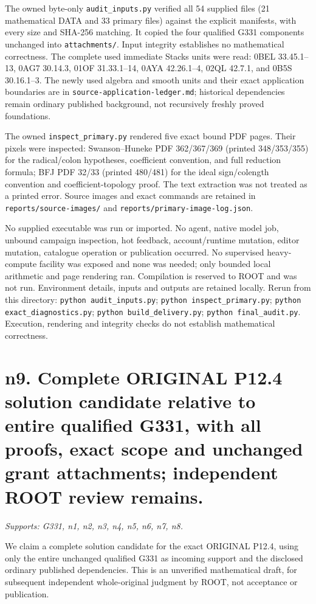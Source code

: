 \documentclass[11pt]{article}
\begin{document}
The owned byte-only \texttt{audit\_inputs.py} verified all 54 supplied files (21 mathematical DATA and 33 primary files) against the explicit manifests, with every size and SHA-256 matching. It copied the four qualified G331 components unchanged into \texttt{attachments/}. Input integrity establishes no mathematical correctness. The complete used immediate Stacks units were read: 0BEL 33.45.1--13, 0AG7 30.14.3, 01OF 31.33.1--14, 0AYA 42.26.1--4, 02QL 42.7.1, and 0B5S 30.16.1--3. The newly used algebra and smooth units and their exact application boundaries are in \texttt{source-application-ledger.md}; historical dependencies remain ordinary published background, not recursively freshly proved foundations.

The owned \texttt{inspect\_primary.py} rendered five exact bound PDF pages. Their pixels were inspected: Swanson--Huneke PDF 362/367/369 (printed 348/353/355) for the radical/colon hypotheses, coefficient convention, and full reduction formula; BFJ PDF 32/33 (printed 480/481) for the ideal sign/colength convention and coefficient-topology proof. The text extraction was not treated as a printed error. Source images and exact commands are retained in \texttt{reports/source-images/} and \texttt{reports/primary-image-log.json}.

No supplied executable was run or imported. No agent, native model job, unbound campaign inspection, hot feedback, account/runtime mutation, editor mutation, catalogue operation or publication occurred. No supervised heavy-compute facility was exposed and none was needed; only bounded local arithmetic and page rendering ran. Compilation is reserved to ROOT and was not run. Environment details, inputs and outputs are retained locally. Rerun from this directory: \texttt{python audit\_inputs.py}; \texttt{python inspect\_primary.py}; \texttt{python exact\_diagnostics.py}; \texttt{python build\_delivery.py}; \texttt{python final\_audit.py}. Execution, rendering and integrity checks do not establish mathematical correctness.

\section{n9. Complete ORIGINAL P12.4 solution candidate relative to entire qualified G331, with all proofs, exact scope and unchanged grant attachments; independent ROOT review remains.}
\textit{Supports: G331, n1, n2, n3, n4, n5, n6, n7, n8.}

We claim a complete solution candidate for the exact ORIGINAL P12.4, using only the entire unchanged qualified G331 as incoming support and the disclosed ordinary published dependencies. This is an unverified mathematical draft, for subsequent independent whole-original judgment by ROOT, not acceptance or publication.
\end{document}
